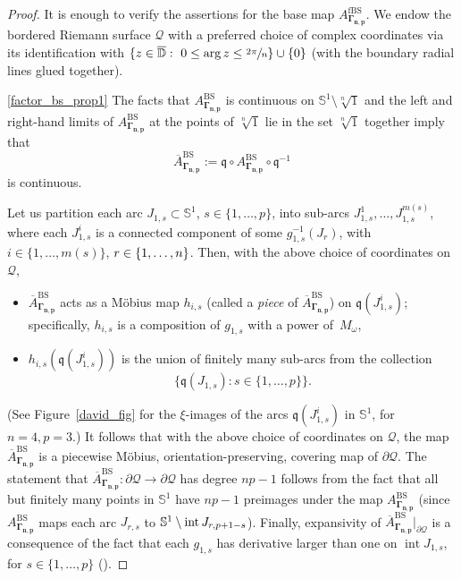 \documentclass[JEP,XML,SOM,Unicode,NoFloatCountersInSection,published]{cedram}
\theoremstyle{definition}
\theoremstyle{remark}
\newcommand{\D}{\mathbb{D}}
\DeclareMathOperator{\Int}{int}
\begin{document}
\begin{proof}
It is enough to verify the assertions for the base map $A_{\pmb{\Gamma_{n,p}}}^{\mathrm{fBS}}$.
We endow the bordered Riemann surface $\mathcal{\mathcal{Q}}$ with a preferred choice of complex coordinates via its identification with $\{z\in\overline{\D}:\ 0\leq\arg{z}\leq\sfrac{2\pi}{n}\}\cup\{0\}$ (with the boundary radial lines glued together).

\eqref{factor_bs_prop1} The facts that $A_{\pmb{\Gamma_{n,p}}}^{\mathrm{BS}}$ is continuous on $\mathbb{S}^1\setminus\sqrt[n]{1}$ and the left and right-hand limits of $A_{\pmb{\Gamma_{n,p}}}^{\mathrm{BS}}$ at the points of $\sqrt[n]{1}$ lie in the set $\sqrt[n]{1}$ together imply that
\[
\overline{A}_{\pmb{\Gamma_{n,p}}}^{\mathrm{BS}}:=\mathfrak{q}\circ A_{\pmb{\Gamma_{n,p}}}^{\mathrm{BS}}\circ\mathfrak{q}^{-1}
\]
is continuous.

Let us partition each arc $J_{1,s}\subset\mathbb{S}^1$, $s\in\{1,\dots,p\}$, into sub-arcs $J_{1,s}^1,\dots, J_{1,s}^{m(s)}$, where each $J_{1,s}^i$ is a connected component of some $g_{1,s}^{-1}(J_r)$, with $i\in\{1,\dots,m(s)\}$, $r\in\nobreak\{1,\dots,n\}$. Then, with the above choice of coordinates on $\mathcal{Q}$,
\begin{itemize}
\item $\overline{A}_{\pmb{\Gamma_{n,p}}}^{\mathrm{BS}}$ acts as a Möbius map $h_{i,s}$ (called a \emph{piece} of $\overline{A}_{\pmb{\Gamma_{n,p}}}^{\mathrm{BS}}$) on $\mathfrak{q}(J_{1,s}^i)$; specifically, $h_{i,s}$ is a composition of $g_{1,s}$ with a power of~$M_\omega$,

\item $h_{i,s}(\mathfrak{q}(J_{1,s}^i))$ is the union of finitely many sub-arcs from the collection
\[
\{\mathfrak{q}(J_{1,s}):s\in\{1,\dots,p\}\}.
\]
\end{itemize}
(See Figure~\ref{david_fig} for the $\xi$-images of the arcs $\mathfrak{q}(J_{1,s}^i)$ in $\mathbb{S}^1$, for $n=4, p=3$.) It follows that with the above choice of coordinates on $\mathcal{Q}$, the map $\overline{A}_{\pmb{\Gamma_{n,p}}}^{\mathrm{BS}}$ is a piecewise Möbius, orientation-preserving, covering map of $\partial\mathcal{Q}$. The statement that $\overline{A}_{\pmb{\Gamma_{n,p}}}^{\mathrm{BS}}:\partial\mathcal{Q}\to\partial\mathcal{Q}$ has degree $np-1$ follows from the fact that all but finitely many points in $\mathbb{S}^1$ have $np-1$ preimages under the map $A_{\pmb{\Gamma_{n,p}}}^{\mathrm{BS}}$ (since $A_{\pmb{\Gamma_{n,p}}}^{\mathrm{BS}}$ maps each arc $J_{r,s}$ to $\mathbb{S}^1\setminus\nobreak\Int{J_{r,p+1-s}}$). Finally, expansivity of $\overline{A}_{\pmb{\Gamma_{n,p}}}^{\mathrm{BS}}\vert_{\partial\mathcal{Q}}$ is a consequence of the fact that each $g_{1,s}$ has derivative larger than one on $\Int{J_{1,s}}$, for $s\in\{1,\dots,p\}$ (\cf \cite[Lem.\,3.8]{LMMN}).


\end{proof}
\end{document}
